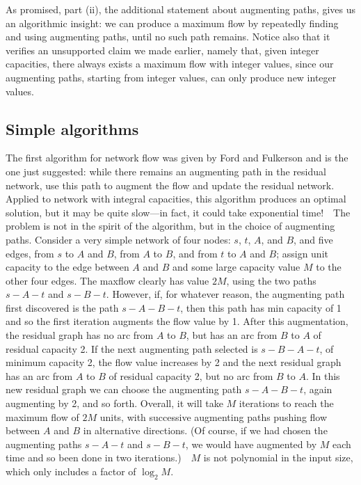 \documentclass[11pt]{article}
\begin{document}
As promised, part (ii), the additional statement about augmenting paths,
gives us an algorithmic insight: we can produce a maximum flow by repeatedly
finding and using augmenting paths, until no such path remains.  Notice also
that it verifies an unsupported claim we made earlier, namely that, given
integer capacities, there always exists a maximum flow with integer values,
since our augmenting paths, starting from integer values, can only produce
new integer values.

\subsection{Simple algorithms}
The first algorithm for network flow was given by Ford and Fulkerson and is
the one just suggested: while there remains an augmenting path in the residual
network, use this path to augment the flow and update the residual network.
Applied to network with integral capacities, this algorithm produces an
optimal solution, but it may be quite slow---in fact, it could take exponential
time!\ \ The problem is not in the spirit of the algorithm, but in the choice
of augmenting paths.  Consider a very simple network of four nodes: $s$, $t$,
$A$, and $B$, and five edges, from $s$ to $A$ and $B$, from $A$ to $B$,
and from $t$ to $A$ and $B$; assign unit capacity to the edge between $A$
and $B$ and some large capacity value $M$ to the other four edges.
The maxflow clearly has value $2M$, using the two paths $s-A-t$ and $s-B-t$.
However, if, for whatever reason, the augmenting path first discovered is
the path $s-A-B-t$, then this path has min capacity of 1 and so the first
iteration augments the flow value by 1.  After this augmentation, the residual
graph has no arc from $A$ to $B$, but has an arc from $B$ to $A$ of residual
capacity 2.   If the next augmenting path selected is $s-B-A-t$, of minimum
capacity 2, the flow value increases by 2 and the next residual graph
has an arc from $A$ to $B$ of residual capacity 2, but no arc from $B$ to $A$.
In this new residual graph we can choose the augmenting path $s-A-B-t$,
again augmenting by 2, and so forth.  Overall, it will take $M$ iterations
to reach the maximum flow of $2M$ units, with successive augmenting paths
pushing flow between $A$ and $B$ in alternative directions.   (Of course,
if we had chosen the augmenting paths $s-A-t$ and $s-B-t$, we would have
augmented by $M$ each time and so been done in two iterations.)\ \ $M$ is
not polynomial in the input size, which only includes a factor of $\log_2 M$.
\end{document}
